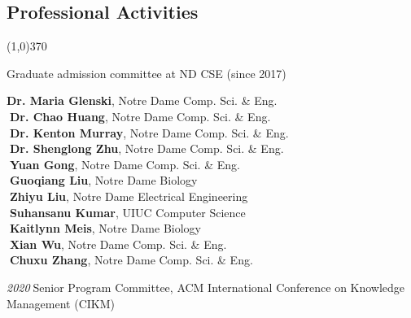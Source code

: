 \documentclass[10pt]{article}
\newenvironment{myindentpar}[1]%
{\begin{list}{}%
         {\setlength{\leftmargin}{#1}}%
         \item[]%
}
{\end{list}}
\newcounter{list}
\begin{document}
\subsection{\sc Professional Activities}
\vspace{-0.4cm} \line(1,0){370} \vspace{-0.1cm}

\begin{myindentpar}{0.75cm}

\hspace{-0.75cm}{\bf Departmental Service}

{\small

\textcolor{white}{} Graduate admission committee at ND CSE (since 2017)
}

\hspace{-0.75cm}{\bf Ph.D. Thesis Committee}

{\small

\textcolor{white}{} {\bf Dr. Maria Glenski}, Notre Dame Comp. Sci. \& Eng. \\
\textcolor{white}{.}{\bf Dr. Chao Huang}, Notre Dame Comp. Sci. \& Eng. \\
\textcolor{white}{.}{\bf Dr. Kenton Murray}, Notre Dame Comp. Sci. \& Eng. \\
\textcolor{white}{.}{\bf Dr. Shenglong Zhu}, Notre Dame Comp. Sci. \& Eng. \\
\textcolor{white}{.}{\bf Yuan Gong}, Notre Dame Comp. Sci. \& Eng. \\
\textcolor{white}{.}{\bf Guoqiang Liu}, Notre Dame Biology \\
\textcolor{white}{.}{\bf Zhiyu Liu}, Notre Dame Electrical Engineering \\
\textcolor{white}{.}{\bf Suhansanu Kumar}, UIUC Computer Science \\
\textcolor{white}{.}{\bf Kaitlynn Meis}, Notre Dame Biology \\
\textcolor{white}{.}{\bf Xian Wu}, Notre Dame Comp. Sci. \& Eng. \\
\textcolor{white}{.}{\bf Chuxu Zhang}, Notre Dame Comp. Sci. \& Eng.
}


\hspace{-0.75cm}{\bf Organizing Committee}

{\small

\hspace{-0.75cm}\emph{2020}\textcolor{white}{.}Senior Program Committee, ACM International Conference on Knowledge Management (CIKM)

}
\end{myindentpar}
\end{document}
